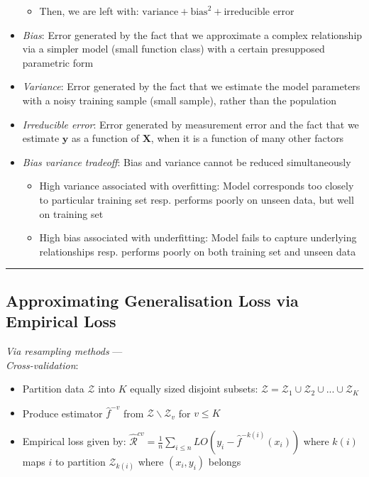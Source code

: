 \begin{itemize}
\begin{itemize}
        \item Then, we are left with: $\textrm{variance} + \textrm{bias}^2 + \textrm{irreducible error}$
    \end{itemize}
    \item \emph{Bias}: Error generated by the fact that we approximate a complex relationship via a simpler model (small function class) with a certain presupposed parametric form
    \item \emph{Variance}: Error generated by the fact that we estimate the model parameters with a noisy training sample (small sample), rather than the population
    \item \emph{Irreducible error}: Error generated by measurement error and the fact that we estimate $\boldsymbol{y}$ as a function of $\boldsymbol{X}$, when it is a function of many other factors
    \item \emph{Bias variance tradeoff}: Bias and variance cannot be reduced simultaneously
    \begin{itemize}
        \item High variance associated with overfitting: Model corresponds too closely to particular training set resp. performs poorly on unseen data, but well on training set 
        \item High bias associated with underfitting: Model fails to capture underlying relationships resp. performs poorly on both training set and unseen data
    \end{itemize}    
\end{itemize}

{\color{black}\hrule height 0.001mm}

\subsection*{Approximating Generalisation Loss via Empirical Loss}
\emph{Via resampling methods} --- \\
\emph{Cross-validation}:
\begin{itemize}
    \item Partition data $\mathcal{Z}$ into $K$ equally sized disjoint subsets: $\mathcal{Z} = \mathcal{Z}_1 \cup \mathcal{Z}_2 \cup ... \cup \mathcal{Z}_K$
    \item Produce estimator $\hat{f}^{-v}$ from $\mathcal{Z} \backslash \mathcal{Z}_v$ for $v \leq K$
    \item Empirical loss given by: $\hat{\mathcal{R}}^{cv} = \frac{1}{n} \sum_{i\leq n} LO(y_i - \hat{f}^{-k(i)} (x_i))$ where $k(i)$ maps $i$ to partition $\mathcal{Z}_{k(i)}$ where $(x_i,y_i)$ belongs
\end{itemize}

